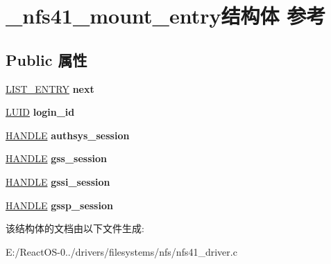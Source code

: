 \hypertarget{struct__nfs41__mount__entry}{}\section{\+\_\+nfs41\+\_\+mount\+\_\+entry结构体 参考}
\label{struct__nfs41__mount__entry}
\subsection*{Public 属性}
\begin{DoxyCompactItemize}
\item 
\mbox{\label{struct__nfs41__mount__entry_af3d75c116ac54bde654a1ca2675b4b3e}} 
\hyperlink{struct___l_i_s_t___e_n_t_r_y}{L\+I\+S\+T\+\_\+\+E\+N\+T\+RY} {\bfseries next}
\item 
\mbox{\label{struct__nfs41__mount__entry_a5cdc6d5aa5f70b917c53fa019dec9624}} 
\hyperlink{struct___l_u_i_d}{L\+U\+ID} {\bfseries login\+\_\+id}
\item 
\mbox{\label{struct__nfs41__mount__entry_a76436633b52eb1575177f56763bd219e}} 
\hyperlink{interfacevoid}{H\+A\+N\+D\+LE} {\bfseries authsys\+\_\+session}
\item 
\mbox{\label{struct__nfs41__mount__entry_ae16f6968bba147befef3e952e983e196}} 
\hyperlink{interfacevoid}{H\+A\+N\+D\+LE} {\bfseries gss\+\_\+session}
\item 
\mbox{\label{struct__nfs41__mount__entry_ab75bd30202a365630c9170988d330634}} 
\hyperlink{interfacevoid}{H\+A\+N\+D\+LE} {\bfseries gssi\+\_\+session}
\item 
\mbox{\label{struct__nfs41__mount__entry_a3200c51d9b96a2f5740f69cbdc41a4d2}} 
\hyperlink{interfacevoid}{H\+A\+N\+D\+LE} {\bfseries gssp\+\_\+session}
\end{DoxyCompactItemize}


该结构体的文档由以下文件生成\+:\begin{DoxyCompactItemize}
\item 
E\+:/\+React\+O\+S-\/0../drivers/filesystems/nfs/nfs41\+\_\+driver.\+c\end{DoxyCompactItemize}
